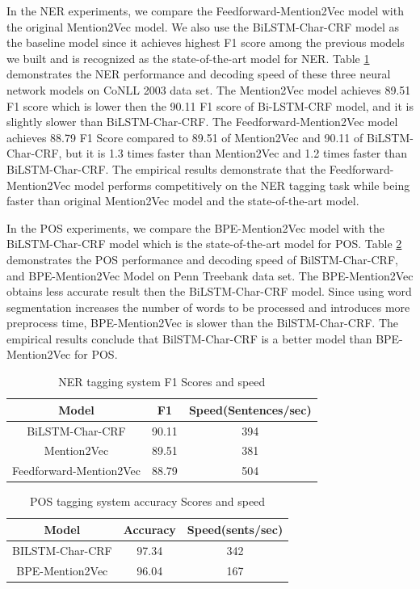 \documentclass{sfuthesis}
\begin{document}
In the NER experiments, we compare the Feedforward-Mention2Vec model with the original Mention2Vec model. We also use the BiLSTM-Char-CRF model as the baseline model since it achieves highest F1 score among the previous models we built and is recognized as the state-of-the-art model for NER. Table \ref{table:ner-mention2vec} demonstrates the NER performance and decoding speed of these three neural network models on CoNLL 2003 data set. The Mention2Vec model achieves 89.51 F1 score which is lower then the 90.11 F1 score of Bi-LSTM-CRF model, and it is slightly slower than BiLSTM-Char-CRF. The Feedforward-Mention2Vec model achieves 88.79 F1 Score compared to 89.51 of Mention2Vec and 90.11 of BiLSTM-Char-CRF, but it is 1.3 times faster than Mention2Vec and 1.2 times faster than BiLSTM-Char-CRF. The empirical results demonstrate that the Feedforward-Mention2Vec model performs competitively on the NER tagging task while being faster than original Mention2Vec model and the state-of-the-art model.

In the POS experiments, we compare the BPE-Mention2Vec model with the BiLSTM-Char-CRF model which is the state-of-the-art model for POS. Table \ref{table:pos-mention2vec} demonstrates the POS performance and decoding speed of BilSTM-Char-CRF, and BPE-Mention2Vec Model on Penn Treebank data set. The BPE-Mention2Vec obtains less accurate result then the BiLSTM-Char-CRF model. Since using word segmentation increases the number of words to be processed and introduces more preprocess time, BPE-Mention2Vec is slower than the BilSTM-Char-CRF. The empirical results conclude that BilSTM-Char-CRF is a better model than BPE-Mention2Vec for POS. 

\begin{table}[]
\centering
\caption{NER tagging system F1 Scores and speed }
\label{table:ner-mention2vec}
\begin{tabular}{|c|c|c|}
\hline
Model            & F1     & Speed(Sentences/sec)        \\ \hline
BiLSTM-Char-CRF & 90.11  & 394                     \\ \hline
Mention2Vec  & 89.51  & 381                     \\ \hline
Feedforward-Mention2Vec      & 88.79  & 504                     \\ \hline
\end{tabular}
\end{table}

\begin{table}[]
\centering
\caption{POS tagging system accuracy Scores and speed}
\label{table:pos-mention2vec}
\begin{tabular}{|c|c|c|}
\hline
Model            & Accuracy     & Speed(sents/sec)        \\ \hline
BILSTM-Char-CRF & 97.34  & 342                    \\ \hline
BPE-Mention2Vec      & 96.04  & 167                    \\ \hline
\end{tabular}
\end{table}
\end{document}
